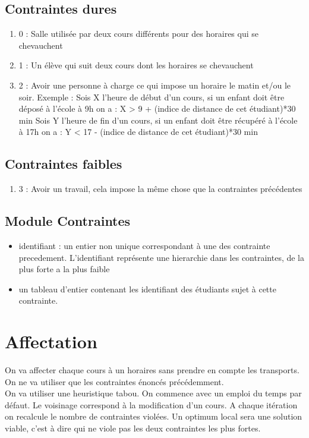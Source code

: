 \documentclass[a4paper,11pt]{article}
\begin{document}
	\subsection{Contraintes dures}
		\begin{enumerate}
			\item 0 : Salle utilisée par deux cours différents pour des horaires 
			qui se chevauchent
			\item 1 : Un élève qui suit deux cours dont les horaires se chevauchent
			\item 2 : Avoir une personne à charge ce qui impose un horaire le matin et/ou le soir.
			Exemple : Sois X l'heure de début d'un cours, si un enfant doit être déposé à l'école à 9h on a : X > 9 + (indice de distance de cet étudiant)*30 min
			Sois Y l'heure de fin d'un cours, si un enfant doit être récupéré à l'école à 17h on a : Y < 17 - (indice de distance de cet étudiant)*30 min			
		\end{enumerate}
	\subsection{Contraintes faibles}
		\begin{enumerate}
			\item 3 : Avoir un travail, cela impose la même chose que la contraintes précédentes
		\end{enumerate}
	\subsection{Module Contraintes}                                                           		\begin{itemize}
			\item identifiant : un entier non unique correspondant à une des contrainte precedement. L'identifiant représente une hierarchie dans les contraintes, de la plus forte a la plus faible 
			\item un tableau d'entier contenant les identifiant des étudiants sujet à cette contrainte.
		\end{itemize}
\section{Affectation}
	On va affecter chaque cours à un horaires sans prendre en compte les transports. On ne va utiliser que les contraintes énoncés précédemment. \\
	On va utiliser une heuristique tabou. On commence avec un emploi du temps par défaut. Le voisinage correspond à la modification d'un cours. A chaque itération on recalcule le nombre de contraintes violées. Un optimum local sera une solution viable, c'est à dire qui ne viole pas les deux contraintes les plus fortes. 
	
\end{document}
